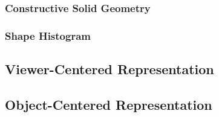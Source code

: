 \documentclass{article}
\begin{document}
\begin{multicols}{2}
\subsubsection{Constructive Solid Geometry}
\subsubsection{Shape Histogram}
\subsection{Viewer-Centered Representation}
\subsection{Object-Centered Representation}

\end{multicols}
\end{document}
